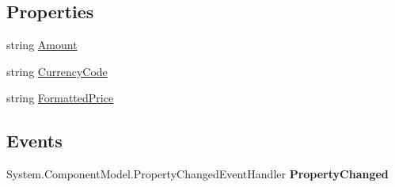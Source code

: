 \subsection*{Properties}
\begin{DoxyCompactItemize}
\item 
\hypertarget{class_amazon___price___finder_1_1amazon_1_1ecs_1_1_price_a92febd1bf0991143bf360ad1bec04036}{string \hyperlink{class_amazon___price___finder_1_1amazon_1_1ecs_1_1_price_a92febd1bf0991143bf360ad1bec04036}{Amount}}\label{class_amazon___price___finder_1_1amazon_1_1ecs_1_1_price_a92febd1bf0991143bf360ad1bec04036}

\begin{DoxyCompactList}\small\item\em \end{DoxyCompactList}\item 
\hypertarget{class_amazon___price___finder_1_1amazon_1_1ecs_1_1_price_add7d5399eed6876bd27d9957b3247b18}{string \hyperlink{class_amazon___price___finder_1_1amazon_1_1ecs_1_1_price_add7d5399eed6876bd27d9957b3247b18}{Currency\-Code}}\label{class_amazon___price___finder_1_1amazon_1_1ecs_1_1_price_add7d5399eed6876bd27d9957b3247b18}

\begin{DoxyCompactList}\small\item\em \end{DoxyCompactList}\item 
\hypertarget{class_amazon___price___finder_1_1amazon_1_1ecs_1_1_price_a25482a125a4bf87be894be77961b6715}{string \hyperlink{class_amazon___price___finder_1_1amazon_1_1ecs_1_1_price_a25482a125a4bf87be894be77961b6715}{Formatted\-Price}}\label{class_amazon___price___finder_1_1amazon_1_1ecs_1_1_price_a25482a125a4bf87be894be77961b6715}

\begin{DoxyCompactList}\small\item\em \end{DoxyCompactList}\end{DoxyCompactItemize}
\subsection*{Events}
\begin{DoxyCompactItemize}
\item 
\hypertarget{class_amazon___price___finder_1_1amazon_1_1ecs_1_1_price_aeaa524dbf175b3ea8cc5443b8e920972}{System.\-Component\-Model.\-Property\-Changed\-Event\-Handler {\bfseries Property\-Changed}}\label{class_amazon___price___finder_1_1amazon_1_1ecs_1_1_price_aeaa524dbf175b3ea8cc5443b8e920972}

\end{DoxyCompactItemize}


